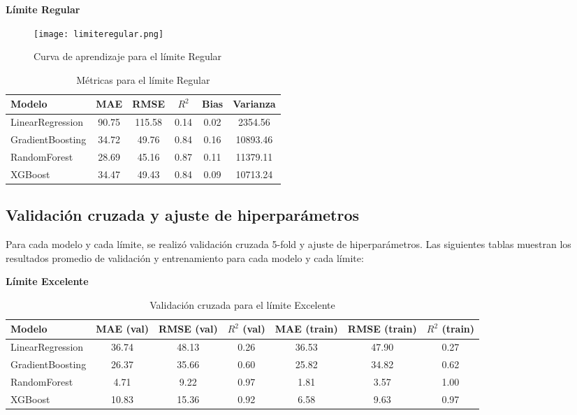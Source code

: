 \documentclass[12pt]{article}
\begin{document}
\textbf{Límite Regular}
\begin{figure}[h!]
    \centering
    \texttt{[image: limiteregular.png]}
    \caption{Curva de aprendizaje para el límite Regular}
\end{figure}
\begin{table}[h!]
    \centering
    \begin{tabular}{lccccc}
        \toprule
        Modelo & MAE & RMSE & $R^2$ & Bias & Varianza \\
        \midrule
        LinearRegression & 90.75 & 115.58 & 0.14 & 0.02 & 2354.56 \\
        GradientBoosting & 34.72 & 49.76 & 0.84 & 0.16 & 10893.46 \\
        RandomForest & 28.69 & 45.16 & 0.87 & 0.11 & 11379.11 \\
        XGBoost & 34.47 & 49.43 & 0.84 & 0.09 & 10713.24 \\
        \bottomrule
    \end{tabular}
    \caption{Métricas para el límite Regular}
\end{table}

\subsection*{Validación cruzada y ajuste de hiperparámetros}
Para cada modelo y cada límite, se realizó validación cruzada 5-fold y ajuste de hiperparámetros. Las siguientes tablas muestran los resultados promedio de validación y entrenamiento para cada modelo y cada límite:

\textbf{Límite Excelente}
\begin{table}[h!]
    \centering
    \begin{tabular}{lcccccc}
        \toprule
        Modelo & MAE (val) & RMSE (val) & $R^2$ (val) & MAE (train) & RMSE (train) & $R^2$ (train) \\
        \midrule
        LinearRegression & 36.74 & 48.13 & 0.26 & 36.53 & 47.90 & 0.27 \\
        GradientBoosting & 26.37 & 35.66 & 0.60 & 25.82 & 34.82 & 0.62 \\
        RandomForest & 4.71 & 9.22 & 0.97 & 1.81 & 3.57 & 1.00 \\
        XGBoost & 10.83 & 15.36 & 0.92 & 6.58 & 9.63 & 0.97 \\
        \bottomrule
    \end{tabular}
    \caption{Validación cruzada para el límite Excelente}
\end{table}
\end{document}
